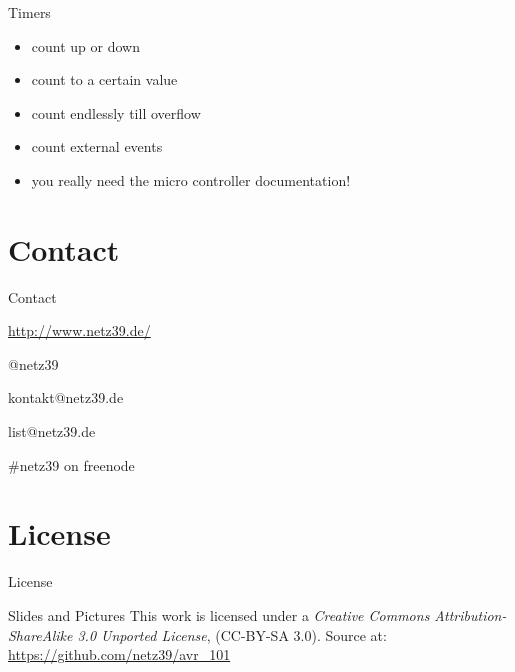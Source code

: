 \documentclass{beamer}
\begin{document}
\begin{frame}{Timers}
    \begin{itemize}
        \item count up or down
        \item count to a certain value
        \item count endlessly till overflow
        \item count external events
        \pause
        \item you really need the micro controller documentation!
    \end{itemize}
\end{frame}

\section{Contact}

\begin{frame}{Contact}
    \begin{center}
        \begin{description}
            \item[WWW] \url{http://www.netz39.de/}
            \item[Twitter/identi.ca] @netz39
            \item[E-Mail] kontakt@netz39.de
            \item[Mailingliste] list@netz39.de
            \item[IRC] \#netz39 on freenode
        \end{description}
    \end{center}
\end{frame}

\appendix

\section{License}

\begin{frame}{License}
    \begin{block}{Slides and Pictures}
        This work is licensed under a \emph{Creative Commons
        Attribution-ShareAlike 3.0 Unported License}, (CC-BY-SA 3.0).
        Source at: \url{https://github.com/netz39/avr_101}
    \end{block}
\end{frame}
\end{document}
